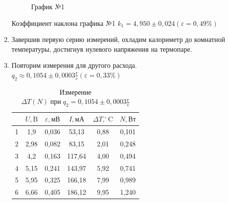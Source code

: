 \documentclass[a4paper]{article}
\begin{document}
\begin{enumerate}
\begin{figure}[h!]
\caption[]{\label{} График №1}
\end{figure}
Коэффициент наклона графика №1 $k_1 = 4,950 \pm 0,024 (\varepsilon = 0,49\%)$

\item Завершив первую серию измерений, охладим калориметр до комнатной температуры, достигнув нулевого напряжения на термопаре.

\item Повторим измерения для другого расхода. $q_2 \approx 0,1054 \pm 0,0003\frac{\text{г}}{\text{c}} (\varepsilon = 0,33\%)$
\clearpage
\begin{table}[h!] 
	\caption{Измерение $\Delta T (N) \; {при} \; q_2 = 0,1054 \pm 0,0003 \frac{\text{г}}{\text{c}}$}
	\begin{center}
		\begin{tabular}{|*{6}{c|}}
			\hline
			\textnumero & $U, \text{B} $ & $\varepsilon,  \text{мВ}$ & $I, \text{мА}$ & $\Delta T, ^\circ\text{C}$ & $N,  \text{Вт} $\\ \hline
			1	&1,9	&0,036&	53,13	&0,88	&0,101 \\ \hline
			2	&2,98	&0,082&	83,15	&2,01	&0,248\\ \hline
			3	&4,2	&0,163	&117,64	&4,00	&0,494\\ \hline
			4	&5,15	&0,241&	143,97&	5,92&	0,741\\ \hline
			5	&5,95	&0,325	&166,18	&7,99&	0,989\\ \hline
			6	&6,66	&0,405	&186,12&9,95	&1,240\\ \hline
		\end{tabular}
	\end{center}
\end{table}



\end{enumerate}
\end{document}
